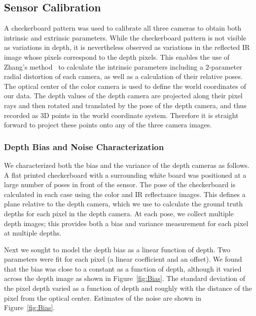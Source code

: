 

\subsection{Sensor Calibration}

A checkerboard pattern was used to calibrate all three cameras to obtain both intrinsic and extrinsic parameters.  While the checkerboard pattern is not visible as variations in depth, it is nevertheless observed as variations in the reflected IR image whose pixels correspond to the depth pixels.  This enables the use of Zhang's method~\cite{Zhang2000} to calculate the intrinsic parameters including a $2$-parameter radial distortion of each camera, as well as a calculation of their relative poses.  The optical center of the color camera is used to define the world coordinates of our data.  The depth values of the depth camera are projected along their pixel rays and then rotated and translated by the pose of the depth camera, and thus recorded as $3$D points in the world coordinate system.
Therefore it is straight forward to project these points onto any of the three camera images.



\subsubsection{Depth Bias and Noise Characterization}
\label{sec:bias}

We characterized both the bias and the variance of the depth cameras as follows.
A flat printed checkerboard with a surrounding white board was positioned at a large number of poses in front of the sensor.
The pose of the checkerboard is calculated in each case using the color and IR reflectance images.
This defines a plane relative to the depth camera, which we use to calculate the ground truth depths for each pixel in the depth camera.
At each pose, we collect multiple depth images; this provides both a bias and variance measurement for each pixel at multiple depths.

Next we sought to model the depth bias as a linear function of depth.
Two parameters were fit for each pixel (a linear coefficient and an offset).
We found that the bias was close to a constant as a function of depth, although it varied across the depth image as shown in Figure~\ref{fig:Bias}.
The standard deviation of the pixel depth varied as a function of depth and roughly with the distance of the pixel from the optical center.
Estimates of the noise are shown in Figure~\ref{fig:Bias}.


